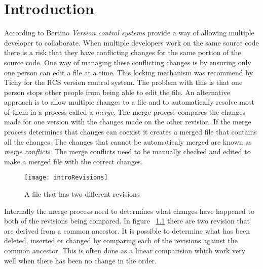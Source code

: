 
\chapter{Introduction}\label{C:intro}

According to Bertino \cite{Bertino2012} \emph{Version control systems} provide a way of allowing multiple developer to collaborate. When multiple developers work on the same source code there is a risk that they have conflicting changes for the same portion of the source code.  One way of managing these conflicting changes is by ensuring only one person can edit a file at a time. This locking mechanism was recommend by Tichy \cite{Tichy1982} for the RCS version control system. The problem with this is that one person stops other people from being able to edit the file. An alternative approach is to allow multiple changes to a file and to automatically resolve most of them in a process called a \emph{merge}.  The merge process compares the changes made for one version with the changes made on the other revision. If the merge process determines that changes can coexist it creates a merged file that contains all the changes. The changes that cannot be automaticaly merged are known as \emph{merge conflicts}.  The merge conflicts need to be manually checked and edited to make a merged file with the correct changes.

\begin{figure}[h]
 \begin{center}
 \texttt{[image: introRevisions]}
 \end{center}
 \caption{A file that has two different revisions}
 \label{fig:introRevisions}
\end{figure}


Internally the merge process need to determines what changes have happened to both of the revisions being compared.   In figure  ~\ref{fig:introRevisions} there are two revision that are derived from a common ancestor. It is possible to determine what has been deleted, inserted or changed by comparing each of the revisions against the common ancestor.  This is often done as a linear comparision which work very well when there has been no change in the order.


